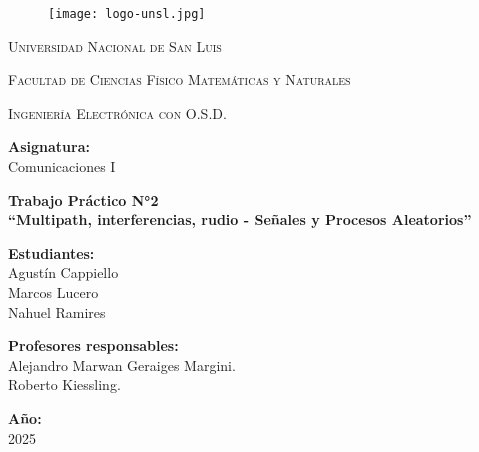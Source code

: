 \documentclass{article}
\begin{document}
	
	\begin{titlepage}	  
		\centering
		
		\begin{figure}
			\centering
			\texttt{[image: logo-unsl.jpg]}
		\end{figure}    
		
		{\scshape\LARGE Universidad Nacional de San Luis\par}
		{\scshape Facultad de Ciencias Físico Matemáticas y Naturales\par}
		{\scshape Ingeniería Electrónica con O.S.D.\par}
		\bigskip 
		\bigskip 
		\bigskip 
		
		\Large \textbf {Asignatura:\\} 
		\LARGE Comunicaciones I
		\bigskip 
		\bigskip 
		\bigskip
		\bigskip
		
		\LARGE \textbf {Trabajo Práctico N°2\\}
		\LARGE \textbf {“Multipath, interferencias, rudio - Señales y Procesos Aleatorios”}
		
		\bigskip
		\bigskip
		\bigskip
		
		\LARGE \textbf {Estudiantes:\\} 
		\LARGE Agustín Cappiello\\
        \LARGE Marcos Lucero\\
        \LARGE Nahuel Ramires\\
		\bigskip
	
		\bigskip
		\bigskip
		\bigskip
		\bigskip
		\bigskip
		\bigskip
		
		\Large \textbf {Profesores responsables:\\} 
		\Large Alejandro Marwan Geraiges Margini. \\ Roberto Kiessling.
		
		\bigskip
		\bigskip
		\bigskip
		\bigskip
		\bigskip
		\bigskip
		\bigskip
		\bigskip
		\bigskip
		
		\Large \textbf {Año:\\} 
		\Large 2025	
	\end{titlepage}
	\newpage
	
	
	
    
    
    
\end{document}
